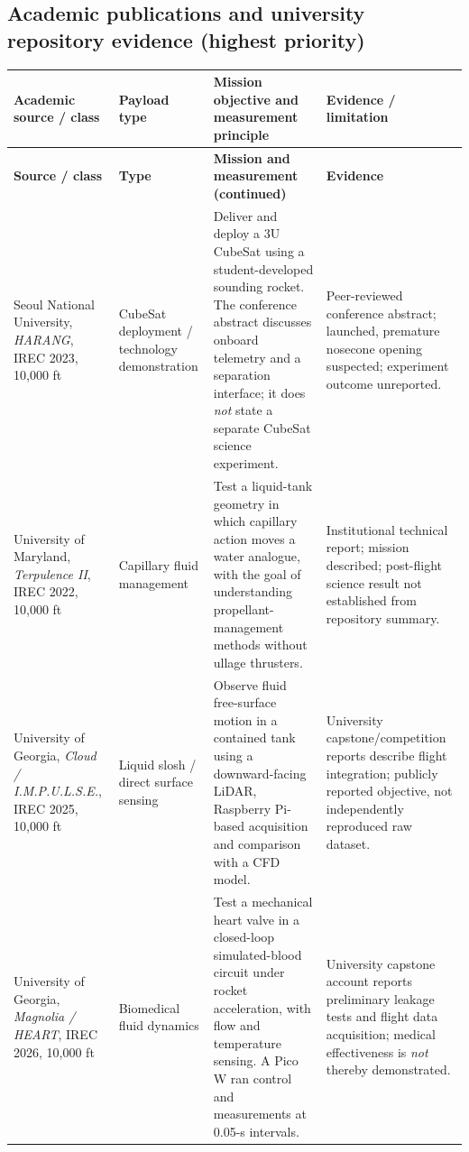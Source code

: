 \documentclass[10pt,a4paper]{article}
\begin{document}
\subsection{Academic publications and university repository evidence (highest priority)}
\small
\begin{longtable}{@{}L{35mm}L{33mm}L{50mm}L{30mm}@{}}
\toprule{}\textbf{Academic source / class} & \textbf{Payload type} & \textbf{Mission objective and measurement principle} & \textbf{Evidence / limitation}\\\midrule\endfirsthead
\toprule{}\textbf{Source / class} & \textbf{Type} & \textbf{Mission and measurement (continued)} & \textbf{Evidence}\\\midrule\endhead
\bottomrule\endlastfoot
Seoul National University, \emph{HARANG}, IREC 2023, 10,000 ft \cite{moon2023harang} & CubeSat deployment / technology demonstration & Deliver and deploy a 3U CubeSat using a student-developed sounding rocket. The conference abstract discusses onboard telemetry and a separation interface; it does \emph{not} state a separate CubeSat science experiment. & Peer-reviewed conference abstract; launched, premature nosecone opening suspected; experiment outcome unreported.\\
University of Maryland, \emph{Terpulence II}, IREC 2022, 10,000 ft \cite{umd2022terpulence} & Capillary fluid management & Test a liquid-tank geometry in which capillary action moves a water analogue, with the goal of understanding propellant-management methods without ullage thrusters. & Institutional technical report; mission described; post-flight science result not established from repository summary.\\
University of Georgia, \emph{Cloud / I.M.P.U.L.S.E.}, IREC 2025, 10,000 ft \cite{uga2025cloud,uga2026capstone} & Liquid slosh / direct surface sensing & Observe fluid free-surface motion in a contained tank using a downward-facing LiDAR, Raspberry Pi-based acquisition and comparison with a CFD model. & University capstone/competition reports describe flight integration; publicly reported objective, not independently reproduced raw dataset.\\
University of Georgia, \emph{Magnolia / HEART}, IREC 2026, 10,000 ft \cite{uga2026magnolia,uga2026capstone} & Biomedical fluid dynamics & Test a mechanical heart valve in a closed-loop simulated-blood circuit under rocket acceleration, with flow and temperature sensing. A Pico W ran control and measurements at 0.05-s intervals. & University capstone account reports preliminary leakage tests and flight data acquisition; medical effectiveness is \emph{not} thereby demonstrated.\\
\end{longtable}
\normalsize
\end{document}
